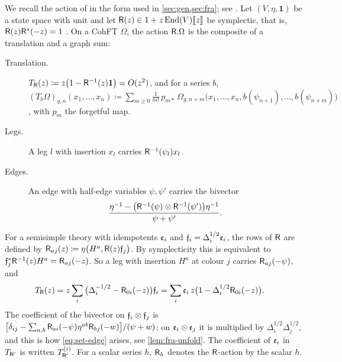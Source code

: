 We recall the action of \cite{PPZ15} in the form used in \cref{sec:gen,sec:fra}; see \cite[Definitions~2.2, 2.5, 2.13 and Proposition~2.14]{PPZ15}. Let $(V,\eta,\mathbf{1})$ be a state space with unit and let $\mathsf{R}(z)\in1+z\operatorname{End}(V)[\![ z ]\!]$ be symplectic, that is, $\mathsf{R}(z)\mathsf{R}^*(-z)=1$ \cite[(5)]{PPZ15}. On a CohFT $\Omega$, the action $\mathsf{R}.\Omega$ is the composite of a translation and a graph sum:
\begin{description}
\item[Translation.] $T_{\mathsf{R}}(z)\coloneqq z\big(1-\mathsf{R}^{-1}(z)\mathbf{1}\big)=O(z^2)$, and for a series $b$, $(T_{b}\Omega)_{g,n}(x_1,\ldots,x_n)\coloneqq\sum_{m\geq0}\frac{1}{m!}\,p_{m*}\,\Omega_{g,n+m}\big(x_1,\ldots,x_n,b(\psi_{n+1}),\ldots,b(\psi_{n+m})\big)$, with $p_m$ the forgetful map.
\item[Legs.] A leg $l$ with insertion $x_l$ carries $\mathsf{R}^{-1}(\psi_l)x_l$.
\item[Edges.] An edge with half-edge variables $\psi,\psi'$ carries the bivector
\[
\frac{\eta^{-1}-\big(\mathsf{R}^{-1}(\psi)\otimes\mathsf{R}^{-1}(\psi')\big)\eta^{-1}}{\psi+\psi'}.
\]
\end{description}

For a semisimple theory with idempotents $\mathfrak{e}_i$ and $\mathfrak{f}_i=\Delta_i^{1/2}\mathfrak{e}_i$, the rows of $\mathsf{R}$ are defined by $\mathsf{R}_{aj}(z)\coloneqq\eta\big(H^a,\mathsf{R}(z)\mathfrak{f}_j\big)$. By symplecticity this is equivalent to $\mathfrak{f}_j^*\mathsf{R}^{-1}(z)H^a=\mathsf{R}_{aj}(-z)$. So a leg with insertion $H^a$ at colour $j$ carries $\mathsf{R}_{aj}(-\psi)$, and
\begin{align*}
T_{\mathsf{R}}(z)&=z\sum_i\big(\Delta_i^{-1/2}-\mathsf{R}_{0i}(-z)\big)\mathfrak{f}_i=\sum_i\mathfrak{e}_i\,z\big(1-\Delta_i^{1/2}\mathsf{R}_{0i}(-z)\big).
\end{align*}
The coefficient of the bivector on $\mathfrak{f}_i\otimes\mathfrak{f}_j$ is $\big[\delta_{ij}-\sum_{a,b}\mathsf{R}_{ai}(-\psi)\eta^{ab}\mathsf{R}_{bj}(-w)\big]/(\psi+w)$; on $\mathfrak{e}_i\otimes\mathfrak{e}_j$ it is multiplied by $\Delta_i^{1/2}\Delta_j^{1/2}$, and this is how \eqref{eq:set-edge} arises, see \cref{lem:fra-unfold}. The coefficient of $\mathfrak{e}_i$ in $T_{\mathsf{R}'}$ is written $T_{\mathsf{R}'}^{(i)}$. For a scalar series $h$, $\mathsf{R}_{h}$ denotes the $\mathsf{R}$-action by the scalar $h$.
